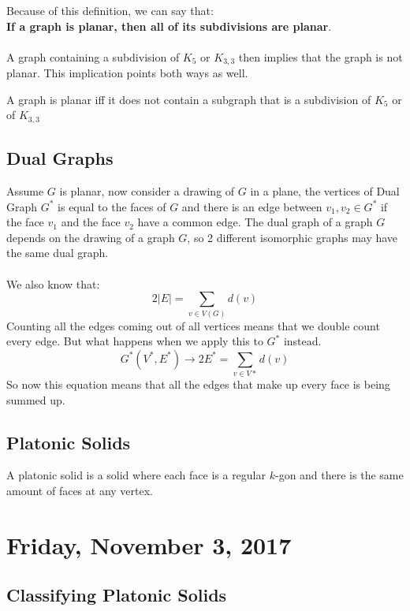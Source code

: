 \documentclass[12pt]{article}
\begin{document}
Because of this definition, we can say that:\\
\textbf{If a graph is planar, then all of its subdivisions are planar}.\\
\\
A graph containing a subdivision of $K_5$ or $K_{3,3}$ then implies that the graph is not planar. This implication points both ways as well.

\begin{tcolorbox}[title=Kuratowski's Theorem]
	A graph is planar iff it does not contain a subgraph that is a subdivision of $K_5$ or of $K_{3,3}$
\end{tcolorbox}

\subsection{Dual Graphs}

Assume $G$ is planar, now consider a drawing of $G$ in a plane, the vertices of Dual Graph $G^*$ is equal to the faces of $G$ and there is an edge between $v_1, v_2 \in G^*$ if the face $v_1$ and the face $v_2$ have a common edge. The dual graph of a graph $G$ depends on the drawing of a graph $G$, so 2 different isomorphic graphs may have the same dual graph.\\
\\
We also know that: 
$$2|E| = \sum_{v \in V(G)} d(v)$$
Counting all the edges coming out of all vertices means that we double count every edge. But what happens when we apply this to $G^*$ instead.
$$G^*(V^*, E^*) \longrightarrow 2E^* = \sum_{v \in V*} d(v)$$
So now this equation means that all the edges that make up every face is being summed up.

\subsection{Platonic Solids}
A platonic solid is a solid where each face is a regular $k$-gon and there is the same amount of faces at any vertex.

\newpage

\section{Friday, November 3, 2017}

\subsection{Classifying Platonic Solids}
\end{document}
